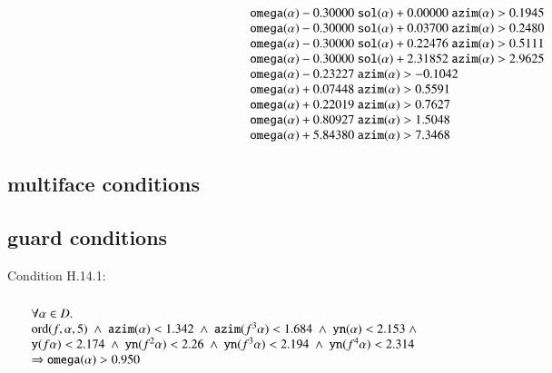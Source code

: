 $$\begin{array}{lll}
   \optt{omega}(\alpha) - 0.30000\ \optt{sol}(\alpha) + 0.00000\ \optt{azim}(\alpha) > 0.1945\\
   \optt{omega}(\alpha) - 0.30000\ \optt{sol}(\alpha) + 0.03700\ \optt{azim}(\alpha) > 0.2480\\
   \optt{omega}(\alpha) - 0.30000\ \optt{sol}(\alpha) + 0.22476\ \optt{azim}(\alpha) > 0.5111\\
   \optt{omega}(\alpha) - 0.30000\ \optt{sol}(\alpha) + 2.31852\ \optt{azim}(\alpha) > 2.9625\\
   \optt{omega}(\alpha) - 0.23227\ \optt{azim}(\alpha) > -0.1042\\
   \optt{omega}(\alpha) + 0.07448\ \optt{azim}(\alpha) > 0.5591\\
   \optt{omega}(\alpha) + 0.22019\ \optt{azim}(\alpha) > 0.7627\\
   \optt{omega}(\alpha) + 0.80927\ \optt{azim}(\alpha) > 1.5048\\
   \optt{omega}(\alpha) + 5.84380\ \optt{azim}(\alpha) > 7.3468\\
\end{array}
$$

\subsection{multiface conditions}\label{sec:multi}



\subsection{guard conditions}\label{sec:guard}


\noindent
Condition H.14.1:  %
$$
\begin{array}{lll}
\leftalign\\
\forall \alpha\in D.\\
  \op{ord}(f,\alpha,5) \sland 
  \optt{azim}(\alpha) < 1.342 \sland
  \optt{azim}(f^3\alpha) < 1.684 \sland
  \optt{yn}(\alpha) < 2.153 \sland \\
   \optt{y}(f\alpha) < 2.174 \sland
  \optt{yn}(f^2\alpha) < 2.26 \sland
  \optt{yn}(f^3 \alpha) < 2.194 \sland
  \optt{yn}(f^4 \alpha) < 2.314  \\
  \Rightarrow
  \optt{omega}(\alpha) > 0.950
\end{array}
$$

